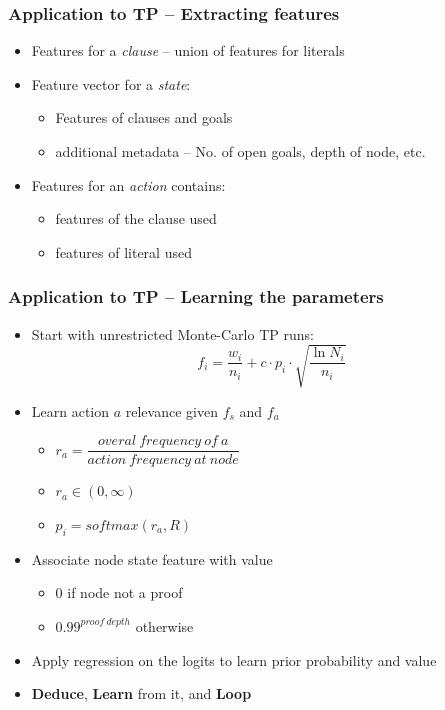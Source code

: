 \documentclass{beamer}
\begin{document}
\begin{frame}
    \frametitle{Application to TP -- Extracting features}
    \begin{itemize}
        \item Features for a \emph{clause} -- union of features for literals
        \pause
        \item Feature vector for a \emph{state}:
            \begin{itemize}
                \item Features of clauses and goals
                \item additional metadata -- No. of open goals, depth of node, etc.
            \end{itemize}
        \pause
        \item Features for an \emph{action} contains:
            \begin{itemize}
                \item features of the clause used
                \item features of literal used
            \end{itemize}
    \end{itemize}
\end{frame}

\begin{frame}
    \frametitle{Application to TP -- Learning the parameters}
    \begin{itemize}
        \item Start with unrestricted Monte-Carlo TP runs:
        \begin{equation*}
            f_i=\frac{w_i}{n_i}+c\cdot p_i \cdot \sqrt{\frac{\ln N_i}{n_i}}
        \end{equation*}
        \item<2-> Learn action $a$ relevance given $f_s$ and $f_a$
            \begin{itemize}
                \item $r_a=\dfrac{overal\ frequency\ of\ a}{action\ frequency\ at\ node}$ 
                \item $r_a \in (0, \infty)$
                \item $p_i=softmax(r_a, R)$ 
            \end{itemize}
        \item<3-> Associate node state feature with value
            \begin{itemize}
                \item 0 if node not a proof
                \item $0.99^{proof\ depth}$ otherwise
            \end{itemize}
        \item<4-> Apply regression on the logits to learn prior probability and value
        \item<4-> \textbf{Deduce}, \textbf{Learn} from it, and \textbf{Loop} \citep{MaLARea}
    \end{itemize}
\end{frame}
\end{document}
